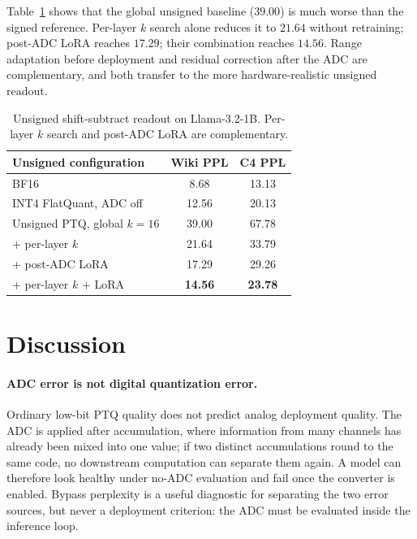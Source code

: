 \documentclass[letterpaper]{article} %
\theoremstyle{plain}
\begin{document}
Table~\ref{tab:unsigned} shows that the global unsigned baseline ($39.00$) is much worse than the signed reference. Per-layer $k$ search alone reduces it to $21.64$ without retraining; post-ADC LoRA reaches $17.29$; their combination reaches $14.56$. Range adaptation before deployment and residual correction after the ADC are complementary, and both transfer to the more hardware-realistic unsigned readout.

\begin{table}[t]
\centering
\small
\setlength{\tabcolsep}{4pt}
\begin{tabular}{@{}l|cc@{}}
\toprule
Unsigned configuration & Wiki PPL & C4 PPL \\
\midrule
BF16 & 8.68 & 13.13 \\
INT4 FlatQuant, ADC off & 12.56 & 20.13 \\
Unsigned PTQ, global $k=16$ & 39.00 & 67.78 \\
\quad + per-layer $k$ & 21.64 & 33.79 \\
\quad + post-ADC LoRA & 17.29 & 29.26 \\
\quad + per-layer $k$ + LoRA & \textbf{14.56} & \textbf{23.78} \\
\bottomrule
\end{tabular}
\caption{Unsigned shift-subtract readout on Llama-3.2-1B. Per-layer $k$ search and post-ADC LoRA are complementary.}
\label{tab:unsigned}
\end{table}

\section{Discussion}

\paragraph{ADC error is not digital quantization error.}
Ordinary low-bit PTQ quality does not predict analog deployment quality. The ADC is applied after accumulation, where information from many channels has already been mixed into one value; if two distinct accumulations round to the same code, no downstream computation can separate them again. A model can therefore look healthy under no-ADC evaluation and fail once the converter is enabled. Bypass perplexity is a useful diagnostic for separating the two error sources, but never a deployment criterion: the ADC must be evaluated inside the inference loop.
\end{document}
